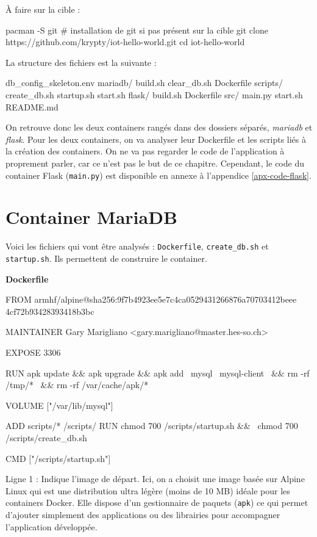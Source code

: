 \documentclass[11pt,a4paper,oneside]{report}
\newcommand{\code}[1]{\texttt{#1}}
\begin{document}
À faire sur la cible :
\begin{bashcode}
pacman -S git # installation de git si pas présent sur la cible
git clone https://github.com/krypty/iot-hello-world.git
cd iot-hello-world
\end{bashcode}

La structure des fichiers est la suivante :
\begin{textcode}
db_config_skeleton.env
mariadb/
    build.sh
    clear_db.sh
    Dockerfile
    scripts/
        create_db.sh
        startup.sh
    start.sh
flask/
    build.sh
    Dockerfile
    src/
        main.py
    start.sh
README.md
\end{textcode}

On retrouve donc les deux containers rangés dans des dossiers séparés, \textit{mariadb} et \textit{flask}. Pour les deux containers, on va analyser leur Dockerfile et les scripts liés à la création des containers. On ne va pas regarder le code de l'application à proprement parler, car ce n'est pas le but de ce chapitre. Cependant, le code du container Flask (\code{main.py}) est disponible en annexe à l'appendice \ref{apx-code-flask}.


\section{Container MariaDB}
Voici les fichiers qui vont être analysés : \code{Dockerfile}, \code{create\_db.sh} et \code{startup.sh}. Ils permettent de construire le container.

\textbf{Dockerfile}
\begin{bashcode}
FROM armhf/alpine@sha256:9f7b4923ee5e7c4ca0529431266876a70703412beee
4cf72b93428393418b3bc

MAINTAINER Gary Marigliano <gary.marigliano@master.hes-so.ch>

EXPOSE 3306

RUN apk update && apk upgrade && apk add \
  mysql \
  mysql-client \
  && rm -rf /tmp/* \
  && rm -rf /var/cache/apk/*

VOLUME ["/var/lib/mysql"]

ADD scripts/* /scripts/
RUN chmod 700 /scripts/startup.sh && \
    chmod 700 /scripts/create_db.sh

CMD ["/scripts/startup.sh"]
\end{bashcode}

Ligne 1 : Indique l'image de départ. Ici, on a choisit une image basée sur Alpine Linux qui est une distribution ultra légère (moins de 10 MB) idéale pour les containers Docker. Elle dispose d'un gestionnaire de paquets (\code{apk}) ce qui permet d'ajouter simplement des applications ou des librairies pour accompagner l'application développée.
\end{document}
